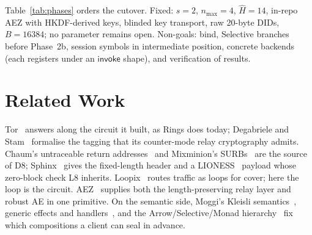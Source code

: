 \documentclass[journal]{IEEEtran}
\newcommand{\Hm}{\hat H}
\begin{document}
Table~\ref{tab:phases} orders the cutover.  Fixed: $s=2$, $n_{\max}=4$,
$\Hm=14$, in-repo AEZ with HKDF-derived keys, blinded key transport, raw
20-byte DIDs, $B=16384$; no parameter remains open.
Non-goals: bind, Selective branches before Phase~2b, session symbols in intermediate position, concrete backends (each registers under an $\mathsf{invoke}$ shape), and
verification of results.

\section{Related Work}\label{sec:related}

Tor~\cite{Dingledine2004} answers along the circuit it built, as Rings does
today; Degabriele and Stam~\cite{Degabriele2018} formalise the tagging that
its counter-mode relay cryptography admits.  Chaum's untraceable return
addresses~\cite{Chaum1981} and Mixminion's SURBs~\cite{Danezis2003} are the
source of D8; Sphinx~\cite{Danezis2009} gives the fixed-length header and a
LIONESS~\cite{Anderson1996} payload whose zero-block check L8 inherits.
Loopix~\cite{Piotrowska2017} routes traffic as loops for cover; here the
loop is the circuit.  AEZ~\cite{Hoang2015,AEZv5} supplies both the
length-preserving relay layer and robust AE in one primitive.  On the
semantic side, Moggi's Kleisli semantics~\cite{Moggi1991}, generic effects
and handlers~\cite{Plotkin2003,Plotkin2009}, and the
Arrow/Selective/Monad hierarchy~\cite{Hughes2000,Lindley2011,Mokhov2019}
fix which compositions a client can seal in advance.



\end{document}

